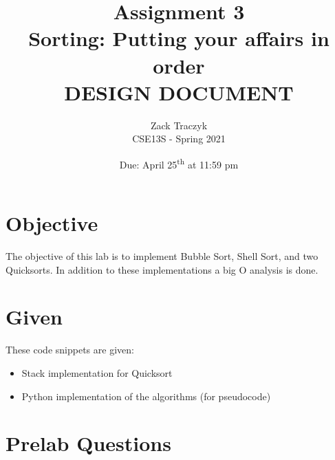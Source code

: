 \documentclass[12pt]{article}
\title{%
    \textbf{Assignment 3 \\ 
    Sorting: Putting your affairs in order \\
    \large DESIGN DOCUMENT} }
\author{Zack Traczyk \\ CSE13S - Spring 2021}
\date{Due: April 25\textsuperscript{th} at 11:59 pm}
\begin{document}
    \maketitle


    \section{Objective}

    The objective of this lab is to implement Bubble Sort, Shell Sort, and two Quicksorts. In addition to these implementations a big O analysis is done.

    \section{Given}

    These code snippets are given:

    \begin{itemize}
        \item Stack implementation for Quicksort
        \item Python implementation of the algorithms (for pseudocode)
    \end{itemize}


    \section{Prelab Questions}
\end{document}
